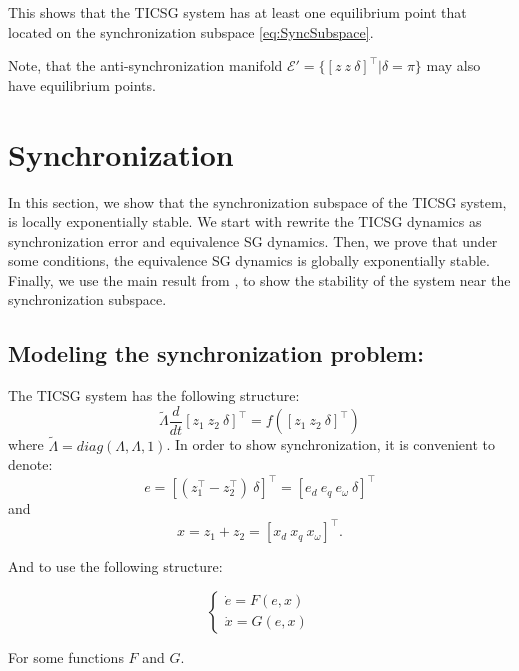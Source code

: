 \documentclass[letterpaper, 10 pt, conference]{ieeeconf}  %
\begin{document}
This shows that the TICSG system has at least one equilibrium point  that located on the synchronization subspace \eqref{eq:SyncSubspace}.

Note, that the anti-synchronization manifold  $\mathscr{E} '=\{ \left[z \ z \ \delta  \right]^\top   |  \delta=\pi \}$ may also have equilibrium points.

\section{Synchronization}

In this section, we show that the synchronization subspace of the TICSG system, is locally exponentially stable.
We start with rewrite the TICSG dynamics as synchronization error
 and equivalence SG dynamics. Then, we  prove that under
some conditions, the equivalence SG dynamics is globally exponentially
stable. Finally, we use the main result from  \cite{AndrieuJayawardhanaPraly},
to show the stability of the system near the synchronization subspace.

\subsection{Modeling the synchronization problem:}
The TICSG system has the following structure:
$$ \tilde{\Lambda}\frac{d}{dt}\left[z_1\ z_2\ \delta\right]^{\top}= f\left( \left[z_1\ z_2\ \delta\right]^{\top} \right)$$
where $\tilde{\Lambda} = diag \left( \Lambda,\Lambda,1 \right) $.
In order to show synchronization, it is convenient to denote:
$$e =  \left[\left(z_1^\top-z_2^\top \right)\ \delta \right]^\top = \left[e_d\ e_q\ e_{\omega}\ \delta \right]^\top $$
and 
$$x =z_1+z_2 = \left[ x_d\ x_q\ x_\omega\right]^\top.$$  

And to use the following structure:

\begin{equation}
\left\{ \begin{array}{c}
\dot{e}=F(e,x)\\
\dot{x}=G(e,x)
\end{array}\right.\label{eq:sync_sestem}
\end{equation}

For some functions $F$ and $G$. 
\end{document}
